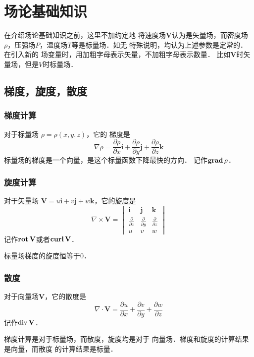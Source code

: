 
\chapter{场论基础知识}

在介绍场论基础知识之前，这里不加约定地
将速度场$\mathbf{V}$认为是矢量场，而密度场
$\rho$，压强场$P$，温度场$T$等是标量场．如无
特殊说明，均认为上述参数是定常的．在引入新的
场变量时，用加粗字母表示矢量，不加粗字母表示数量．
比如$\mathbf{V}$时矢量场，但是$V$时标量场．
\section{梯度，旋度，散度}
\subsection{梯度计算}
对于标量场 $\rho=\rho(x,y,z)$，它的
梯度是
$$
    \nabla \rho=\frac{\partial \rho}{\partial x}\mathbf{i}
    +\frac{\partial \rho}{\partial y}\mathbf{j}
    +\frac{\partial \rho}{\partial z}\mathbf{k}
$$
标量场的梯度是一个向量，是这个标量函数下降最快的方向．
记作$\mathbf{grad}\, \rho$．

\subsection{旋度计算}
对于矢量场 $\mathbf{V}=u \mathbf{i}+
v \mathbf{j} +w \mathbf{k}$，它的旋度是
\begin{equation*}
    \nabla\times \mathbf{V}=
    \begin{vmatrix}
        \mathbf{i} & \mathbf{j}                   & \mathbf{k} \\
        \frac{\partial}{\partial x}
                   & \frac{\partial }{\partial y}
                   & \frac{\partial }{\partial z}              \\
        u          & v                            & w
    \end{vmatrix}
\end{equation*}
记作$\mathbf{rot}\,\mathbf{V}$或者$\mathbf{curl}\,\mathbf{V}$．
\begin{note}
标量场梯度的旋度恒等于0．
\end{note}

  
\subsection{散度}
对于向量场$\mathbf{V}$，它的散度是
\[
  \nabla\cdot\mathbf{V}=
  \frac{\partial u}{\partial x}+
  \frac{\partial v }{\partial y}+
  \frac{\partial w }{\partial z}
\]
记作$\operatorname*{div}\mathbf{V}$．
\begin{notice}
梯度计算是对于标量场，而散度，旋度均是对于
向量场．梯度和旋度的计算结果是向量，而散度
的计算结果是标量．
\end{notice}

